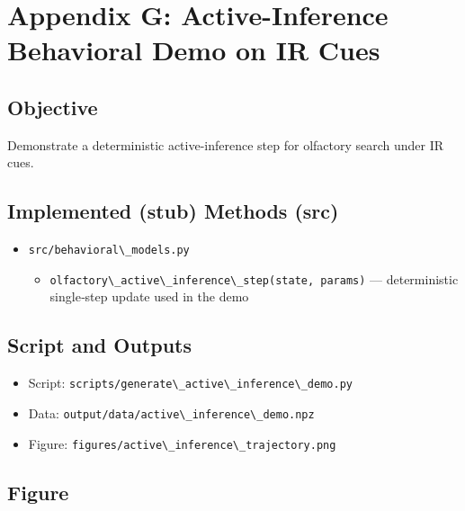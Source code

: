\documentclass[
  13pt,
  a4paperpaper,
  12pt]{article}
\author{}
\date{}
\newcommand{\passthrough}[1]{#1}
\providecommand{\tightlist}{%
  \setlength{\itemsep}{0pt}\setlength{\parskip}{0pt}}
\let\oldsection\section
\renewcommand{\section}{\clearpage\oldsection}
\begin{document}
{
\hypersetup{linkcolor=black}
\setcounter{tocdepth}{3}
\tableofcontents
}
\section{Appendix G: Active-Inference Behavioral Demo on IR
Cues}\label{sec:app_active_inference}

\subsection{Objective}\label{objective}

Demonstrate a deterministic active-inference step for olfactory search
under IR cues.

\subsection{Implemented (stub) Methods
(src)}\label{implemented-stub-methods-src}

\begin{itemize}
\tightlist
\item
  \passthrough{\lstinline!src/behavioral\_models.py!}

  \begin{itemize}
  \tightlist
  \item
    \passthrough{\lstinline!olfactory\_active\_inference\_step(state, params)!}
    --- deterministic single‑step update used in the demo
  \end{itemize}
\end{itemize}

\subsection{Script and Outputs}\label{script-and-outputs}

\begin{itemize}
\tightlist
\item
  Script:
  \passthrough{\lstinline!scripts/generate\_active\_inference\_demo.py!}
\item
  Data:
  \passthrough{\lstinline!output/data/active\_inference\_demo.npz!}
\item
  Figure:
  \passthrough{\lstinline!figures/active\_inference\_trajectory.png!}
\end{itemize}

\subsection{Figure}\label{figure}
\end{document}
